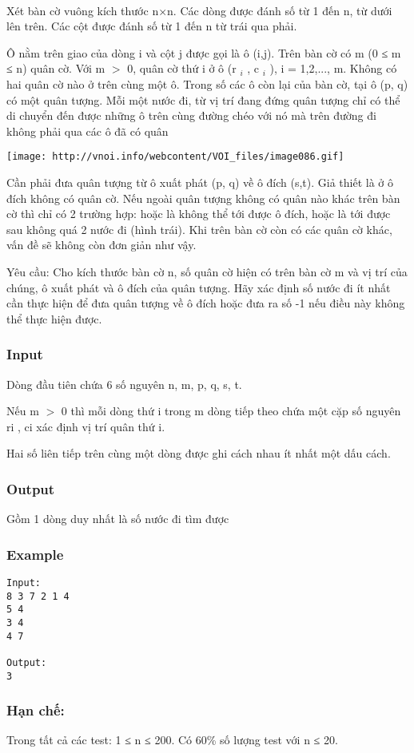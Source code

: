 

 

Xét bàn cờ vuông kích thước n×n. Các dòng được đánh số từ 1 đến n, từ dưới lên trên. Các cột được đánh số từ 1 đến n từ trái qua phải.

Ô nằm trên giao của dòng i và cột j được gọi là ô (i,j). Trên bàn cờ có m (0 ≤ m ≤ n) quân cờ. Với m $>$ 0, quân cờ thứ i ở ô (r $_ i $ , c $_ i $ ), i = 1,2,..., m. Không có hai quân cờ nào ở trên cùng một ô. Trong số các ô còn lại của bàn cờ, tại ô (p, q) có một quân tượng. Mỗi một nước đi, từ vị trí đang đứng quân tượng chỉ có thể di chuyển đến được những ô trên cùng đường chéo với nó mà trên đường đi không phải qua các ô đã có quân


\texttt{[image: http://vnoi.info/webcontent/VOI\_files/image086.gif]}

Cần phải đưa quân tượng từ ô xuất phát (p, q) về ô đích (s,t). Giả thiết là ở ô đích không có quân cờ. Nếu ngoài quân tượng không có quân nào khác trên bàn cờ thì chỉ có 2 trường hợp: hoặc là không thể tới được ô đích, hoặc là tới được sau không quá 2 nước đi (hình trái). Khi trên bàn cờ còn có các quân cờ khác, vấn đề sẽ không còn đơn giản như vậy.

Yêu cầu: Cho kích thước bàn cờ n, số quân cờ hiện có trên bàn cờ m và vị trí của chúng, ô xuất phát và ô đích của quân tượng. Hãy xác định số nước đi ít nhất cần thực hiện để đưa quân tượng về ô đích hoặc đưa ra số -1 nếu điều này không thể thực hiện được.

\subsubsection{Input}

Dòng đầu tiên chứa 6 số nguyên n, m, p, q, s, t.

Nếu m $>$ 0 thì mỗi dòng thứ i trong m dòng tiếp theo chứa một cặp số nguyên ri , ci xác định vị trí quân thứ i.

Hai số liên tiếp trên cùng một dòng được ghi cách nhau ít nhất một dấu cách.

\subsubsection{Output}

Gồm 1 dòng duy nhất là số nước đi tìm được

\subsubsection{Example}
\begin{verbatim}
Input:
8 3 7 2 1 4
5 4
3 4
4 7

Output:
3
\end{verbatim}

\subsubsection{Hạn chế:}

Trong tất cả các test: 1 ≤ n ≤ 200. Có 60\% số lượng test với n ≤ 20.